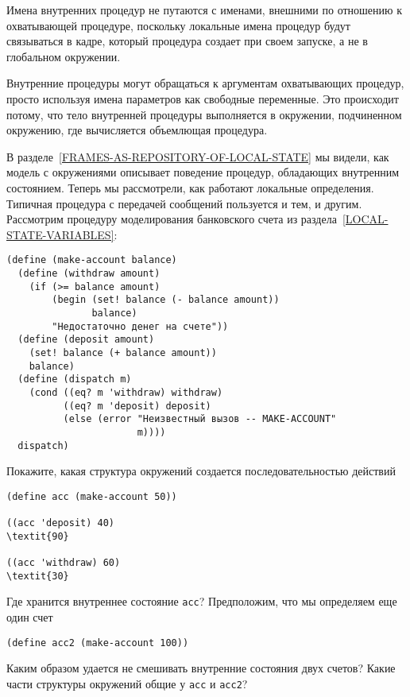 \begin{plainlist}


\item
Имена внутренних процедур не путаются с именами,
внешними по отношению к охватывающей процедуре, поскольку локальные
имена процедур будут связываться в кадре, который процедура создает
при своем запуске, а не в глобальном окружении.

\item
Внутренние процедуры могут обращаться к аргументам
охватывающих процедур, просто используя имена параметров как свободные
переменные.  Это происходит потому, что тело внутренней процедуры
выполняется в окружении, подчиненном окружению, где вычисляется
объемлющая процедура.
\end{plainlist}
\begin{exercise}{3.11}\label{EX3.11}%
В
разделе~\ref{FRAMES-AS-REPOSITORY-OF-LOCAL-STATE} мы видели, как
модель с окружениями описывает поведение процедур, обладающих
внутренним состоянием.  Теперь мы рассмотрели, как работают локальные
определения.     Типичная процедура с передачей сообщений
пользуется и тем, и другим. Рассмотрим процедуру моделирования   банковского счета из раздела~\ref{LOCAL-STATE-VARIABLES}:

\begin{Verbatim}[fontsize=\small]
(define (make-account balance)
  (define (withdraw amount)
    (if (>= balance amount)
        (begin (set! balance (- balance amount))
               balance)
        "Недостаточно денег на счете"))
  (define (deposit amount)
    (set! balance (+ balance amount))
    balance)
  (define (dispatch m)
    (cond ((eq? m 'withdraw) withdraw)
          ((eq? m 'deposit) deposit)
          (else (error "Неизвестный вызов -- MAKE-ACCOUNT"
                       m))))
  dispatch)
\end{Verbatim}
Покажите, какая структура окружений создается последовательностью
действий

\begin{Verbatim}[fontsize=\small]
(define acc (make-account 50))

((acc 'deposit) 40)
\textit{90}

((acc 'withdraw) 60)
\textit{30}
\end{Verbatim}
Где хранится внутреннее состояние {\tt acc}?  Предположим, что
мы определяем еще один счет

\begin{Verbatim}[fontsize=\small]
(define acc2 (make-account 100))
\end{Verbatim}
Каким образом удается не смешивать внутренние состояния двух счетов?
Какие части структуры окружений общие у {\tt acc} и
{\tt acc2}?
\end{exercise}

